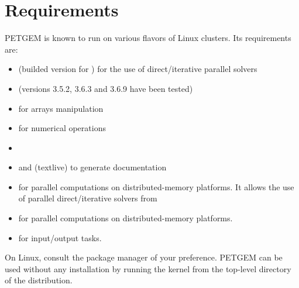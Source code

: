 \documentclass[letterpaper,10pt,english]{sphinxmanual}
\begin{document}
\section{Requirements}
\label{\detokenize{Installation:requirements}}\label{\detokenize{Installation:requeriments}}
PETGEM is known to run on various flavors of Linux clusters. Its requirements are:
\begin{itemize}
\item {} 
 (builded version for ) for the use of direct/iterative parallel solvers

\item {} 
 (versions 3.5.2, 3.6.3 and 3.6.9 have been tested)

\item {} 
 for arrays manipulation

\item {} 
 for numerical operations

\item {} 

\item {} 
 and  (textlive) to generate documentation

\item {} 
 for parallel computations on distributed-memory platforms. It allows the use of parallel direct/iterative solvers from 

\item {} 
 for parallel computations on distributed-memory platforms.

\item {} 
 for input/output tasks.

\end{itemize}

On Linux, consult the package manager of your preference. PETGEM can be
used without any installation by running the kernel from the top-level
directory of the distribution.
\end{document}
